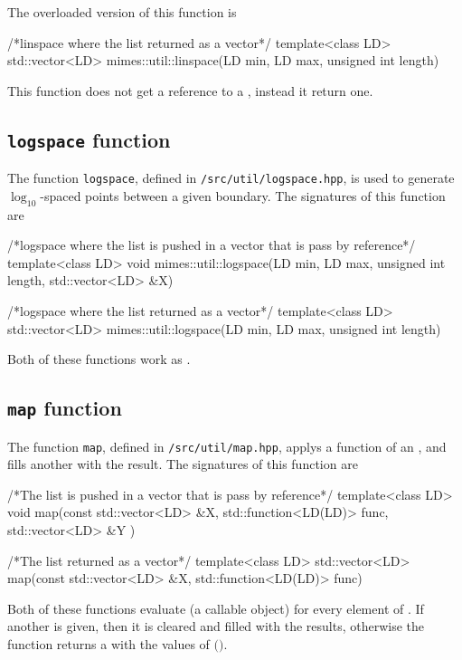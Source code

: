 \documentclass[11pt,a4paper]{article}
\begin{document}
The overloaded version of this function is 
%
\begin{cpp}
    /*linspace where the list returned as a vector*/
	template<class LD>
	std::vector<LD> mimes::util::linspace(LD min, LD max, unsigned int length)
\end{cpp}
%
This function does not get a reference to a , instead it return one.

\subsection{{\tt logspace} function}
%
The function {\tt logspace}, defined in {\tt \mimes/src/util/logspace.hpp}, is used to generate $\log_{10}$-spaced points between a given boundary. The signatures of this function are
%
\begin{cpp}
    /*logspace where the list is pushed in a vector that is pass by reference*/
	template<class LD>
	void mimes::util::logspace(LD min, LD max, unsigned int length, std::vector<LD> &X)

    /*logspace where the list returned as a vector*/
	template<class LD>
	std::vector<LD> mimes::util::logspace(LD min, LD max, unsigned int length)
\end{cpp}
%
Both of these functions work as .

\subsection{{\tt map} function}
%
The function {\tt map}, defined in {\tt \mimes/src/util/map.hpp}, applys a function of an , and fills another  with the result. The signatures of this function are

\begin{cpp}
    /*The list is pushed in a vector that is pass by reference*/
	template<class LD>
	void map(const std::vector<LD> &X, std::function<LD(LD)> func,  std::vector<LD> &Y )

    /*The list returned as a vector*/
	template<class LD>
	std::vector<LD> map(const std::vector<LD> &X, std::function<LD(LD)> func)
\end{cpp}
%
Both of these functions evaluate  (a callable object) for every element of . If another  is given, then it is cleared and filled with the results, otherwise the function returns a  with the values of  $($$)$.  
\end{document}

